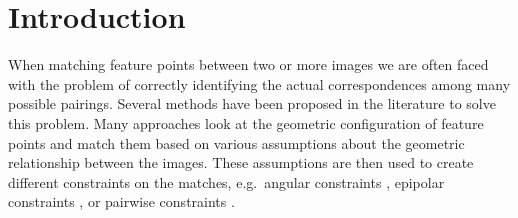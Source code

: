 \documentclass[conference]{IEEEtran}
\begin{document}
\section{Introduction}
%
When matching feature points between two or more images we are often 
faced with the problem of correctly identifying the actual 
correspondences among many possible pairings. Several methods have been 
proposed in the literature to solve this problem. Many approaches look 
at the geometric configuration of feature points and match them based on 
various assumptions about the geometric relationship between the images. 
These assumptions are then used to create different constraints on the 
matches, e.g.\ angular constraints \cite{kim2008efficient}, epipolar 
constraints \cite{torr2000mlesac,chum2005matching}, or pairwise 
constraints \cite{choi2009robust,leordeanu2005spectral}.
%
\end{document}
